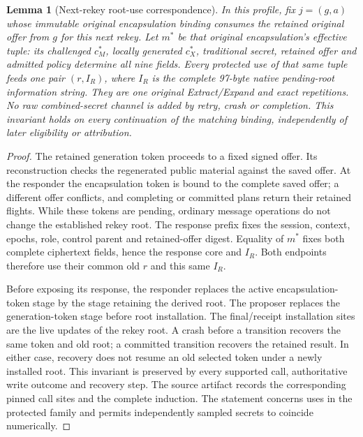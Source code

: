 \documentclass[pdflatex]{sn-jnl}
\theoremstyle{thmstyleone}
\newtheorem{lemma}[theorem]{Lemma}
\theoremstyle{thmstylethree}
\theoremstyle{thmstyletwo}
\begin{document}
\begin{lemma}[Next-rekey root-use correspondence]
\label{lem:cb-native-root-use}
In this profile, fix $j=(g,a)$ whose immutable original encapsulation
binding consumes the retained original offer from $g$ for this next rekey.
Let $m^*$ be that original encapsulation's effective tuple: its challenged
$c_M^*$, locally generated $c_X^*$, traditional secret, retained offer and
admitted policy determine all nine fields. Every protected
use of that same tuple feeds one pair $(r,I_R)$, where $I_R$ is the complete
97-byte native pending-root information string. They are one original
Extract/Expand and exact repetitions. No raw combined-secret channel is
added by retry, crash or completion. This invariant holds on every
continuation of the matching binding, independently of later eligibility
or attribution.
\end{lemma}
\begin{proof}
The retained generation token proceeds to a fixed signed offer. Its
reconstruction checks the regenerated public material against the saved
offer. At the responder the encapsulation token is bound to the complete
saved offer; a different offer conflicts, and completing or committed
plans return their retained flights. While these tokens are pending,
ordinary message operations do not change the established rekey root.
The response prefix fixes the session, context, epochs, role, control
parent and retained-offer digest. Equality of $m^*$ fixes both complete
ciphertext fields, hence the response core and $I_R$. Both endpoints
therefore use their common old $r$ and this same $I_R$.

Before exposing its response, the responder replaces the active
encapsulation-token stage by the stage retaining the derived root.
The proposer replaces the generation-token stage before root installation.
The final/receipt installation sites are the live updates of the rekey
root. A crash before a transition recovers the same token and old root; a
committed transition recovers the retained result. In either case, recovery
does not resume an old selected token under a newly installed root. This invariant is preserved
by every supported call, authoritative write outcome and recovery step.
The source artifact records the corresponding pinned call sites and the
complete induction. The statement concerns uses in the protected family
and permits independently sampled secrets to coincide numerically.
\end{proof}
\end{document}
